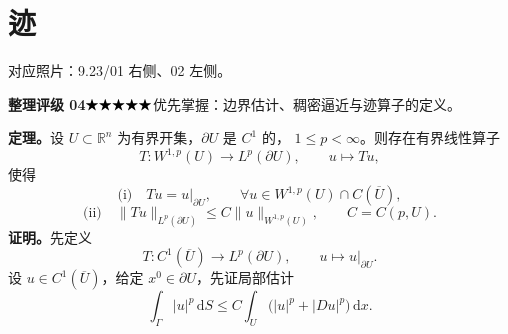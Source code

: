 \documentclass[UTF8,a4paper,11pt,fontset=fandol]{ctexart}
\newcommand{\R}{\mathbb R}
\newcommand{\dd}{\,\mathrm d}
\newcommand{\source}[1]{{\small\color{notegray}对应照片：#1。}\par}
\newcommand{\proofstars}[1]{\ensuremath{%
\ifnum#1>0\relax\bigstar\fi
\ifnum#1>1\relax\bigstar\fi
\ifnum#1>2\relax\bigstar\fi
\ifnum#1>3\relax\bigstar\fi
\ifnum#1>4\relax\bigstar\fi}}
\newcommand{\proofrating}[3]{\par{\small\color{proofblue}%
\textbf{整理评级 #1}\enspace\proofstars{#2}\quad #3\par}}
\begin{document}
\section{迹}
\source{9.23/01 右侧、02 左侧}
\proofrating{04}{5}{优先掌握：边界估计、稠密逼近与迹算子的定义。}
\textbf{定理。}设 $U\subset\R^n$ 为有界开集，$\partial U$ 是 $C^1$ 的，
$1\leq p<\infty$。则存在有界线性算子
\[
T:W^{1,p}(U)\longrightarrow L^p(\partial U),\qquad u\longmapsto Tu,
\]
使得
\[
\text{(i)}\quad Tu=u|_{\partial U},\qquad
\forall u\in W^{1,p}(U)\cap C(\overline U),
\]
\[
\text{(ii)}\quad\|Tu\|_{L^p(\partial U)}\leq C\|u\|_{W^{1,p}(U)},
\qquad C=C(p,U).
\]
\textbf{证明。}先定义
\[
T:C^1(\overline U)\longrightarrow L^p(\partial U),\qquad
u\longmapsto u|_{\partial U}.
\]
设 $u\in C^1(\overline U)$，给定 $x^0\in\partial U$，先证局部估计
\[
\int_\Gamma|u|^p\dd S\leq C\int_U\bigl(|u|^p+|Du|^p\bigr)\dd x.
\]

\newpage
\end{document}
